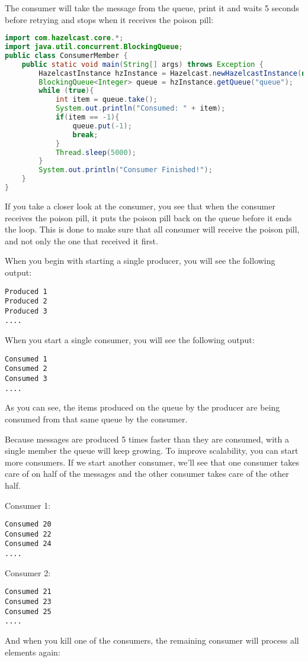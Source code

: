 The consumer will take the message from the queue, print it and waits 5 seconds before retrying and stops when it receives the poison pill:
\begin{lstlisting}[language=java]
import com.hazelcast.core.*;
import java.util.concurrent.BlockingQueue;
public class ConsumerMember {
    public static void main(String[] args) throws Exception {
        HazelcastInstance hzInstance = Hazelcast.newHazelcastInstance(null);
        BlockingQueue<Integer> queue = hzInstance.getQueue("queue");
        while (true){
            int item = queue.take();
            System.out.println("Consumed: " + item);
            if(item == -1){
                queue.put(-1);
                break;
            }     
            Thread.sleep(5000);            
        }
        System.out.println("Consumer Finished!");
    }
}
\end{lstlisting}
If you take a closer look at the consumer, you see that when the consumer receives the poison pill, it puts the poison pill back on the queue before it ends the loop. This is done to make sure that all consumer will receive the poison pill, and not only the one that received it first.

When you begin with starting a single producer, you will see the following output:
\begin{lstlisting}
Produced 1
Produced 2
Produced 3
....
\end{lstlisting}
When you start a single consumer, you will see the following output:
\begin{lstlisting}
Consumed 1
Consumed 2
Consumed 3
....
\end{lstlisting}
As you can see, the items produced on the queue by the producer are being consumed from that same queue by the consumer. 

Because messages are produced 5 times faster than they are consumed, with a single member the queue will keep growing. To improve scalability, you can start more consumers. If we start another consumer, we'll see that one consumer takes care of on half of the messages and the other consumer takes care of the other half.

Consumer 1:
\begin{lstlisting}
Consumed 20
Consumed 22
Consumed 24
....
\end{lstlisting}
Consumer 2:
\begin{lstlisting}
Consumed 21
Consumed 23
Consumed 25
....
\end{lstlisting}
And when you kill one of the consumers, the remaining consumer will process all elements again:

